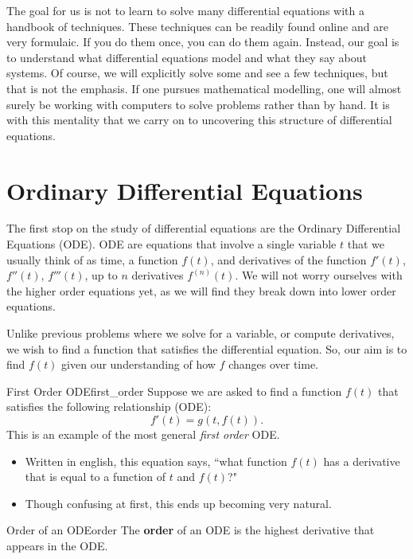         The goal for us is not to learn to solve many differential equations with a handbook of techniques.  These techniques can be readily found online and are very formulaic.  If you do them once, you can do them again.  Instead, our goal is to understand what differential equations model and what they say about systems.  Of course, we will explicitly solve some and see a few techniques, but that is not the emphasis.  If one pursues mathematical modelling, one will almost surely be working with computers to solve problems rather than by hand. It is with this mentality that we carry on to uncovering this structure of differential equations.
        
        \section{Ordinary Differential Equations}
        
        The first stop on the study of differential equations are the Ordinary Differential Equations (ODE).  ODE are equations that involve a single variable $t$ that we usually think of as time, a function $f(t)$, and derivatives of the function $f'(t)$, $f''(t)$, $f'''(t)$, up to $n$ derivatives $f^{(n)}(t)$.  We will not worry ourselves with the higher order equations yet, as we will find they break down into lower order equations.
        
        Unlike previous problems where we solve for a variable, or compute derivatives, we wish to find a function that satisfies the differential equation.  So, our aim is to find $f(t)$ given our understanding of how $f$ changes over time.
        
        \begin{ex}{First Order ODE}{first_order}
        Suppose we are asked to find a function $f(t)$ that satisfies the following relationship (ODE):
        \[
        f'(t) = g(t,f(t)).
        \]
        This is an example of the most general \emph{first order} ODE. 
        \begin{itemize}
            \item Written in english, this equation says, ``what function $f(t)$ has a derivative that is equal to a function of $t$ and $f(t)$?"
            \item Though confusing at first, this ends up becoming very natural.
        \end{itemize}
        \end{ex}
        
        \begin{df}{Order of an ODE}{order}
        The \textbf{order} of an ODE is the highest derivative that appears in the ODE.
        \end{df}
        
